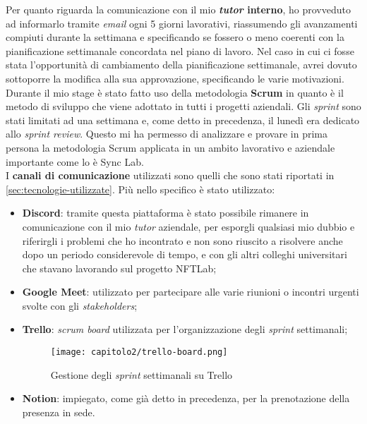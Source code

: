 Per quanto riguarda la comunicazione con il mio \textbf{\textit{tutor} interno}, ho provveduto ad informarlo tramite \textit{email} ogni 5 giorni lavorativi, riassumendo gli avanzamenti compiuti durante la settimana e specificando se fossero o meno coerenti con la pianificazione settimanale concordata nel piano di lavoro. Nel caso in cui ci fosse stata l'opportunità di cambiamento della pianificazione settimanale, avrei dovuto sottoporre la modifica alla sua approvazione, specificando le varie motivazioni. \\

Durante il mio stage è stato fatto uso della metodologia \textbf{Scrum} in quanto è il metodo di sviluppo che viene adottato in tutti i progetti aziendali. Gli \textit{sprint} sono stati limitati ad una settimana e, come detto in precedenza, il lunedì era dedicato allo \textit{sprint review}. Questo mi ha permesso di analizzare e provare in prima persona la metodologia Scrum applicata in un ambito lavorativo e aziendale importante come lo è Sync Lab. \\

I \textbf{canali di comunicazione} utilizzati sono quelli che sono stati riportati in \ref{sec:tecnologie-utilizzate}. Più nello specifico è stato utilizzato:
\begin{itemize}
  \item \textbf{Discord}: tramite questa piattaforma è stato possibile rimanere in comunicazione con il mio \textit{tutor} aziendale, per esporgli qualsiasi mio dubbio e riferirgli i problemi che ho incontrato e non sono riuscito a risolvere anche dopo un periodo considerevole di tempo, e con gli altri colleghi universitari che stavano lavorando sul progetto NFTLab;
  \item \textbf{Google Meet}: utilizzato per partecipare alle varie riunioni o incontri urgenti svolte con gli \textit{stakeholders};
  \item \textbf{Trello}: \textit{scrum board} utilizzata per l'organizzazione degli \textit{sprint} settimanali;
  
  \begin{figure}[!h]
    \centering
    \texttt{[image: capitolo2/trello-board.png]}
    \caption{Gestione degli \textit{sprint} settimanali su Trello}
  \end{figure}

  \item \textbf{Notion}: impiegato, come già detto in precedenza, per la prenotazione della presenza in sede.
\end{itemize}

